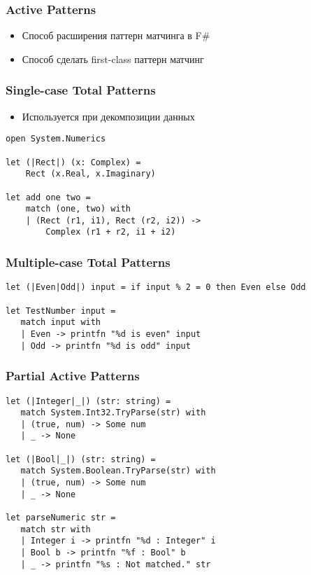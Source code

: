 \documentclass[xetex,mathserif,serif]{beamer}
\begin{document}
    \begin{frame}[fragile]
        \frametitle{Active Patterns}

        \begin{itemize}
            \item Способ расширения паттерн матчинга в F\#
            \item Способ сделать first-class паттерн матчинг
        \end{itemize}

    \end{frame}

    \begin{frame}[fragile]
        \frametitle{Single-case Total Patterns}

        \begin{itemize}
            \item Используется при декомпозиции данных
        \end{itemize}

        \begin{verbatim}
open System.Numerics

let (|Rect|) (x: Complex) =
    Rect (x.Real, x.Imaginary)

let add one two =
    match (one, two) with
    | (Rect (r1, i1), Rect (r2, i2)) ->
        Complex (r1 + r2, i1 + i2)
        \end{verbatim}

    \end{frame}

    \begin{frame}[fragile]
        \frametitle{Multiple-case Total Patterns}

        \begin{verbatim}
let (|Even|Odd|) input = if input % 2 = 0 then Even else Odd

let TestNumber input =
   match input with
   | Even -> printfn "%d is even" input
   | Odd -> printfn "%d is odd" input
        \end{verbatim}

    \end{frame}

    \begin{frame}[fragile]
        \frametitle{Partial Active Patterns}
        \begin{verbatim}
let (|Integer|_|) (str: string) =
   match System.Int32.TryParse(str) with
   | (true, num) -> Some num
   | _ -> None

let (|Bool|_|) (str: string) =
   match System.Boolean.TryParse(str) with
   | (true, num) -> Some num
   | _ -> None

let parseNumeric str =
   match str with
   | Integer i -> printfn "%d : Integer" i
   | Bool b -> printfn "%f : Bool" b
   | _ -> printfn "%s : Not matched." str
        \end{verbatim}

    \end{frame}
\end{document}
